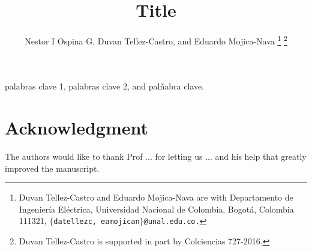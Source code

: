 \documentclass[letterpaper,10pt,conference,draftcls,onecolumn]{ieeeconf} %
\theoremstyle{plain}
\begin{document}
\title{\LARGE \bf  Title}

\author{Nestor I Ospina G, Duvan Tellez-Castro,
        and Eduardo Mojica-Nava
\thanks{Duvan Tellez-Castro and Eduardo Mojica-Nava are with Departamento de Ingenier\'ia El\'ectrica, Universidad Nacional de Colombia, Bogot\'a, Colombia 111321, $\{$\texttt{datellezc, eamojican$\}$@unal.edu.co.}}        
\thanks{Duvan Tellez-Castro is supported in part by Colciencias 727-2016.}
}        
 
\maketitle

\begin{abstract}

 
 
\end{abstract}
\begin{keywords}
	palabras clave 1, palabras clave 2, and palñabra clave. %
\end{keywords}



 
 
 
\section*{Acknowledgment}
The authors would like to thank Prof ... for  letting us ... and his help that greatly improved the manuscript.
%
\end{document}
